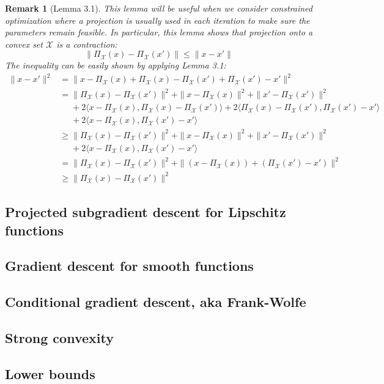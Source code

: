 \documentclass{scrartcl}
\newtheorem*{remark}{Remark}
\newcommand{\sX}{\mathcal{X}}
\begin{document}
\begin{remark}[Lemma 3.1]
This lemma will be useful when we consider constrained optimization where a projection is usually
used in each iteration to make sure the parameters remain feasible. In particular, this lemma shows
that projection onto a convex set $\sX$ is a \emph{contraction}:
\begin{equation}
  \|\Pi_\sX(x)-\Pi_\sX(x')\| \leq \|x-x'\|
\end{equation}
The inequality can be easily shown by applying Lemma 3.1:
\[
  \begin{aligned}
  \|x-x'\|^2
  &= \|x-\Pi_\sX(x) + \Pi_\sX(x)-\Pi_\sX(x') + \Pi_\sX(x') - x'\|^2 \\
  &= \|\Pi_\sX(x)-\Pi_\sX(x')\|^2 + \|x-\Pi_\sX(x)\|^2 + \|x'-\Pi_\sX(x')\|^2 \\
  &\mathrel{\phantom{=}}
     + 2\langle x-\Pi_\sX(x), \Pi_\sX(x)-\Pi_\sX(x')\rangle
     + 2\langle \Pi_\sX(x)-\Pi_\sX(x'), \Pi_\sX(x')-x'\rangle \\
  &\mathrel{\phantom{=}}
     + 2\langle x-\Pi_\sX(x), \Pi_\sX(x')-x'\rangle \\
  &\geq \|\Pi_\sX(x)-\Pi_\sX(x')\|^2 + \|x-\Pi_\sX(x)\|^2 + \|x'-\Pi_\sX(x')\|^2 \\
  &\mathrel{\phantom{=}}
     + 2\langle x-\Pi_\sX(x), \Pi_\sX(x')-x'\rangle \\
  &= \|\Pi_\sX(x)-\Pi_\sX(x')\|^2 + \|(x-\Pi_\sX(x)) + (\Pi_\sX(x')-x')\|^2 \\
  &\geq \|\Pi_\sX(x)-\Pi_\sX(x')\|^2
  \end{aligned}
\]
\end{remark}

\subsection{Projected subgradient descent for Lipschitz functions}
\subsection{Gradient descent for smooth functions}
\subsection{Conditional gradient descent, aka Frank-Wolfe}
\subsection{Strong convexity}
\subsection{Lower bounds}
\end{document}
